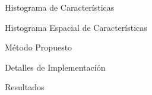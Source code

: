\documentclass{beamer}
\begin{document}
\begin{frame}{Histograma de Características}
\end{frame}


\begin{frame}{Histograma Espacial de Características}
\end{frame}


\begin{frame}{Método Propuesto}
\end{frame}


\begin{frame}{Detalles de Implementación}
\end{frame}


\begin{frame}{Resultados}
\end{frame}





    
    

 
    

\end{document}
